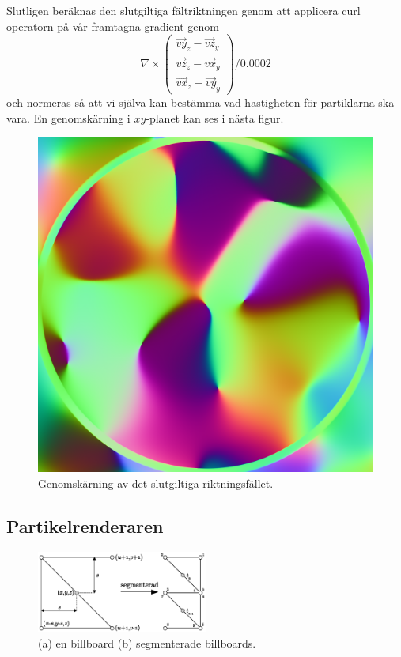 \documentclass[a4paper]{article}
\begin{document}
\begin{multicols}{2}
Slutligen beräknas den slutgiltiga fältriktningen genom att applicera curl operatorn på vår framtagna gradient genom
\begin{equation}
 \nabla \times \begin{pmatrix}
\vec{vy}_z - \vec{vz}_y
\\ 
\vec{vz}_z - \vec{vx}_y
\\ 
\vec{vx}_z - \vec{vy}_y
\end{pmatrix} / 0.0002
\end{equation}
och normeras så att vi själva kan bestämma vad hastigheten för partiklarna ska vara. En genomskärning i $xy$-planet kan ses i nästa figur.
\begin{figure}[H]
\center
\begin{minipage}[]{0.3\textwidth}
\includegraphics[width=\textwidth]{share/Curl_downscale.png}
\caption{Genomskärning av det slutgiltiga riktningsfället.}
\end{minipage}
\end{figure}

\subsection{Partikelrenderaren} \label{sec:partikelrenderaren}

\begin{figure}[H]
\center
\includegraphics[width=0.5\textwidth]{share/Billboards.eps}
    \caption{(a) en billboard (b) segmenterade billboards.}
\end{figure}


\end{multicols}
\end{document}

